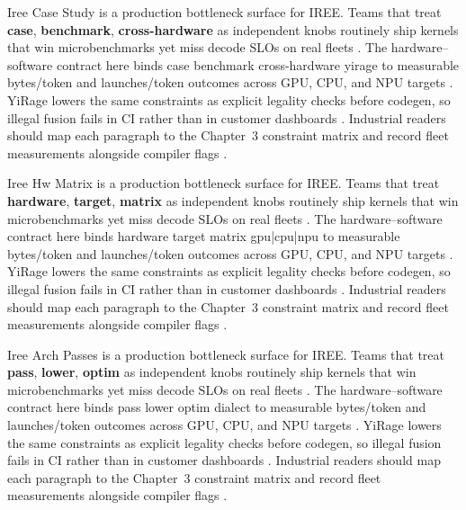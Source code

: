 Iree Case Study is a production bottleneck surface for IREE. Teams that treat \textbf{case}, \textbf{benchmark}, \textbf{cross-hardware} as independent knobs routinely ship kernels that win microbenchmarks yet miss decode SLOs on real fleets \citep{taxbreak2026,semianalysis2024tma}. The hardware--software contract here binds case benchmark cross-hardware yirage to measurable bytes/token and launches/token outcomes across GPU, CPU, and NPU targets \citep{memoryfloor2026,amd2024xdna}. YiRage lowers the same constraints as explicit legality checks before codegen, so illegal fusion fails in CI rather than in customer dashboards \citep{nvidia2022hopper,amd2024aie}. Industrial readers should map each paragraph to the Chapter~3 constraint matrix and record fleet measurements alongside compiler flags \citep{semianalysis2024tma,dlbook}.

Iree Hw Matrix is a production bottleneck surface for IREE. Teams that treat \textbf{hardware}, \textbf{target}, \textbf{matrix} as independent knobs routinely ship kernels that win microbenchmarks yet miss decode SLOs on real fleets \citep{memoryfloor2026,amd2024xdna}. The hardware--software contract here binds hardware target matrix gpu|cpu|npu to measurable bytes/token and launches/token outcomes across GPU, CPU, and NPU targets \citep{nvidia2022hopper,amd2024aie}. YiRage lowers the same constraints as explicit legality checks before codegen, so illegal fusion fails in CI rather than in customer dashboards \citep{semianalysis2024tma,dlbook}. Industrial readers should map each paragraph to the Chapter~3 constraint matrix and record fleet measurements alongside compiler flags \citep{amd2024xdna,dao2022flashattention}.

Iree Arch Passes is a production bottleneck surface for IREE. Teams that treat \textbf{pass}, \textbf{lower}, \textbf{optim} as independent knobs routinely ship kernels that win microbenchmarks yet miss decode SLOs on real fleets \citep{nvidia2022hopper,amd2024aie}. The hardware--software contract here binds pass lower optim dialect to measurable bytes/token and launches/token outcomes across GPU, CPU, and NPU targets \citep{semianalysis2024tma,dlbook}. YiRage lowers the same constraints as explicit legality checks before codegen, so illegal fusion fails in CI rather than in customer dashboards \citep{amd2024xdna,dao2022flashattention}. Industrial readers should map each paragraph to the Chapter~3 constraint matrix and record fleet measurements alongside compiler flags \citep{amd2024aie,kwon2023vllm}.


